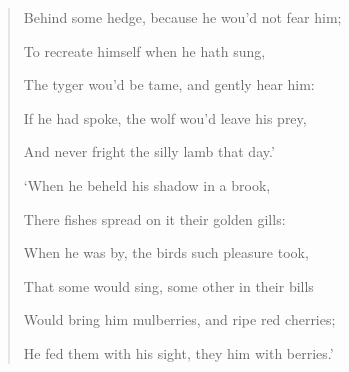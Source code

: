 \documentclass[a4paper, 11pt, oneside, polutonikogreek, english]{article}
\begin{document}
\begin{quotation}
Behind some hedge, because he wou'd not fear him;

To recreate himself when he hath sung,

The tyger wou'd be tame, and gently hear him:

\hspace*{15mm}If he had spoke, the wolf wou'd leave his prey,

\hspace*{15mm}And never fright the silly lamb that day.'

\bigskip

`When he beheld his shadow in a brook,

There fishes spread on it their golden gills:

When he was by, the birds such pleasure took,

That some would sing, some other in their bills

\hspace*{15mm}Would bring him mulberries, and ripe red cherries;

\hspace*{15mm}He fed them with his sight, they him with berries.'
\end{quotation}
\end{document}
